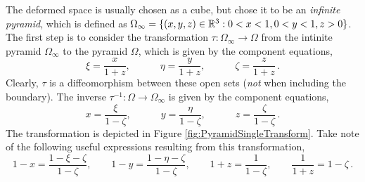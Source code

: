 The deformed space is usually chosen as a cube, but \citet{Nigam_Phillips_11} chose it to be an \textit{infinite pyramid}, which is defined as $\Omega_\infty=\{(x,y,z)\in\mathbb{R}^3:0<x<1,0<y<1,z>0\}$.
The first step is to consider the transformation $\tau:\Omega_\infty\rightarrow\Omega$ from the intinite pyramid $\Omega_\infty$ to the pyramid $\Omega$, which is given by the component equations,
\begin{equation}
	\xi=\frac{x}{1+z},\quad\qquad\eta=\frac{y}{1+z},\quad\qquad\zeta=\frac{z}{1+z}\,.
\end{equation}
Clearly, $\tau$ is a diffeomorphism between these open sets (\textit{not} when including the boundary).
The inverse $\tau^{-1}:\Omega\rightarrow\Omega_\infty$ is given by the component equations,
\begin{equation}
	x=\frac{\xi}{1-\zeta},\quad\qquad y=\frac{\eta}{1-\zeta},\quad\qquad z=\frac{\zeta}{1-\zeta}\,.
\end{equation}
The transformation is depicted in Figure \ref{fig:PyramidSingleTransform}.
Take note of the following useful expressions resulting from this transformation,
\begin{equation*}
	1-x=\frac{1-\xi-\zeta}{1-\zeta},\quad\quad 1-y=\frac{1-\eta-\zeta}{1-\zeta},\quad\quad
	1+z=\frac{1}{1-\zeta},\quad\quad \frac{1}{1+z}=1-\zeta\,.
\end{equation*}

